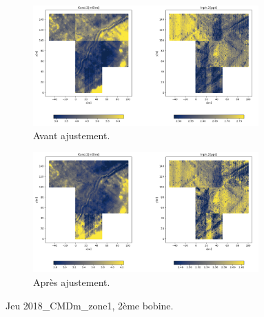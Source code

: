 \documentclass[12pt]{article}
\begin{document}
    \begin{figure}[ht!]
        \centering
        \begin{subfigure}[b]{\textwidth}
            \centering
            \includegraphics[width=0.95\textwidth]{Images/Frontiere_ex_2.png}
            \caption[]%
            {{ \small Avant ajustement.}}    
        \end{subfigure}
        \centering
        \begin{subfigure}[b]{\textwidth}  
            \centering 
            \includegraphics[width=0.95\textwidth]{Images/Frontiere_ex_2_aj.png}
            \caption[]%
            {{\small Après ajustement.}}    
        \end{subfigure}
        \caption{Jeu 2018\_CMDm\_zone1, 2ème bobine.}
    \end{figure}
\newpage
\end{document}
